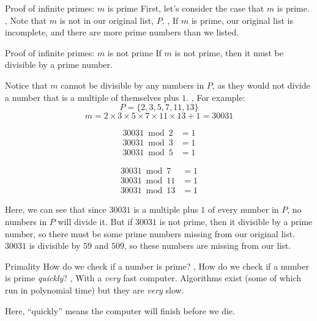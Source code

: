 \begin{namedframe}{Proof of infinite primes: $m$ is prime}
	First, let's consider the case that $m$ is prime.
	\sep
	Note that $m$ is not in our original list, $P$.
	\sep
	If $m$ is prime, our original list is incomplete, and there are more prime numbers than we listed.
\end{namedframe}
\begin{namedframe}{Proof of infinite primes: $m$ is not prime}
	If $m$ is not prime, then it must be divisible by a prime number.

	Notice that $m$ cannot be divisible by any numbers in $P$, as they would not divide a number that is a multiple of themselves plus $1$.
	\sep
	For example:
	\vspace{-1ex}
	\[P = \{2,3,5,7,11,13\}\]
	\vspace{-3ex}
	\[m = 2 \times 3 \times 5 \times 7 \times 11 \times 13 + 1 = \num{30031}\]
	\varsep{-5ex}
	\begin{center}
		\begin{minipage}{0.45\textwidth}
			\begin{align*}
				\num{30031} \bmod 2 &= 1\\
				\num{30031} \bmod 3 &= 1\\
				\num{30031} \bmod 5 &= 1
			\end{align*}
		\end{minipage}
		\begin{minipage}{0.45\textwidth}
			\begin{align*}
				\num{30031} \bmod 7  &= 1\\
				\num{30031} \bmod 11 &= 1\\
				\num{30031} \bmod 13 &= 1
			\end{align*}
		\end{minipage}
	\end{center}
	\varvsep{-2ex}
	Here, we can see that since $\num{30031}$ is a multiple plus $1$ of every number in $P$, no numbers in $P$ will divide it.
	\pause
	But if $\num{30031}$ is not prime, then it divisible by a prime number, so there must be some prime numbers missing from our original list.
	\pause
	$\num{30031}$ is divisible by $59$ and $509$, so these numbers are missing from our list.
\end{namedframe}
\begin{namedframe}{Primality}
	How do we check if a number is prime?
	\sep
	How do we check if a number is prime \emph{quickly}?
	\sep
	With a \emph{very} fast computer. Algorithms exist (some of which run in polynomial time) but they are \emph{very} slow.

	Here, ``quickly'' means the computer will finish before we die.
\end{namedframe}
